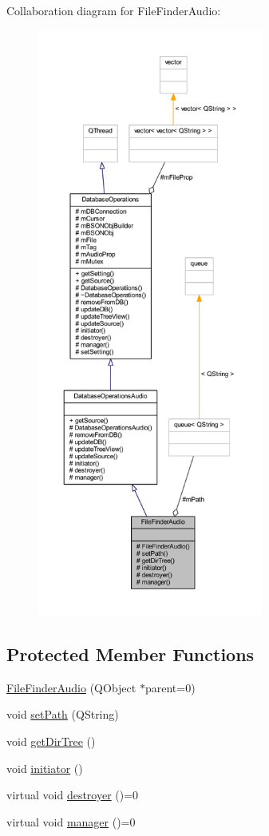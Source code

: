 Collaboration diagram for File\-Finder\-Audio\-:
\nopagebreak
\begin{figure}[H]
\begin{center}
\leavevmode
\includegraphics[height=550pt]{class_file_finder_audio__coll__graph}
\end{center}
\end{figure}
\subsection*{Protected Member Functions}
\begin{DoxyCompactItemize}
\item 
\hyperlink{class_file_finder_audio_ac55cb6b9449535fa894bf28b676c5d90}{File\-Finder\-Audio} (Q\-Object $\ast$parent=0)
\item 
void \hyperlink{class_file_finder_audio_a75465aa7c289474f155d1e20acb23e65}{set\-Path} (Q\-String)
\item 
void \hyperlink{class_file_finder_audio_a7d590d88a79ee9327c86761ce1f6e89b}{get\-Dir\-Tree} ()
\item 
void \hyperlink{class_file_finder_audio_af8153dd34e8691aab1445413b3a86d12}{initiator} ()
\item 
virtual void \hyperlink{class_file_finder_audio_aeab95a78219b1fb187da1cae16a6b9c8}{destroyer} ()=0
\item 
virtual void \hyperlink{class_file_finder_audio_ab11c9010b5031e4e251e2fe592ea6321}{manager} ()=0
\end{DoxyCompactItemize}
